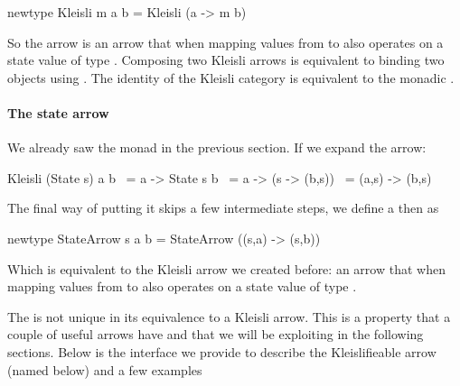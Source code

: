 \begin{haskellcode}
newtype Kleisli m a b = Kleisli (a -> m b)
\end{haskellcode}

So the arrow  is an arrow that when
mapping values from  to  also operates on a state
value of type . Composing two Kleisli arrows is equivalent to
binding two  objects using \hask{>=>}. The identity of
the Kleisli category is equivalent to the monadic .

\paragraph{The state arrow}

We already saw the  monad in the previous section. If we expand
the  arrow:

\begin{haskellcode}
Kleisli (State s) a b
  ~= a -> State s b
  ~= a -> (s -> (b,s))
  ~= (a,s) -> (b,s)
\end{haskellcode}

The final way of putting it skips a few intermediate steps, we define
a  then as

\begin{haskellcode}
newtype StateArrow s a b = StateArrow ((s,a) -> (s,b))
\end{haskellcode}

Which is equivalent to the Kleisli arrow we created before: an arrow
that when mapping values from  to  also operates on a state
value of type .

The  is not unique in its equivalence to a Kleisli
arrow. This is a property that a couple of useful arrows have and that
we will be exploiting in the following sections. Below is the
interface we provide to describe the Kleislifieable arrow (named
 below) and a few examples

